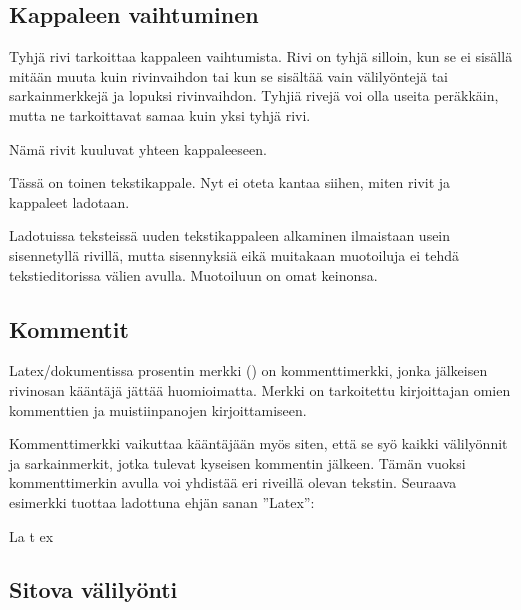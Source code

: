 \subsection{Kappaleen vaihtuminen}

Tyhjä rivi tarkoittaa kappaleen vaihtumista. Rivi on tyhjä silloin, kun
se ei sisällä mitään muuta kuin rivinvaihdon tai kun se sisältää vain
välilyöntejä tai sarkainmerkkejä ja lopuksi rivinvaihdon. Tyhjiä rivejä
voi olla useita peräkkäin, mutta ne tarkoittavat samaa kuin yksi tyhjä
rivi.

\begin{koodilohkosis}
  Nämä rivit kuuluvat
  yhteen kappaleeseen.

  Tässä on toinen tekstikappale.
  Nyt ei oteta kantaa siihen, miten
  rivit ja kappaleet ladotaan.
\end{koodilohkosis}

Ladotuissa teksteissä uuden tekstikappaleen alkaminen ilmaistaan usein
sisennetyllä rivillä, mutta sisennyksiä eikä muitakaan muotoiluja ei
tehdä tekstieditorissa välien avulla. Muotoiluun on omat keinonsa.

\subsection{Kommentit}

Latex\-/dokumentissa prosentin merkki (\koodi{\%}) on kommenttimerkki,
jonka jälkeisen rivin\-osan kääntäjä jättää huomioimatta. Merkki on
tarkoitettu kirjoittajan omien kommenttien ja muistiinpanojen
kirjoittamiseen.

\begin{koodilohkosis}
\end{koodilohkosis}

Kommenttimerkki vaikuttaa kääntäjään myös siten, että se syö kaikki
välilyönnit ja sarkainmerkit, jotka tulevat kyseisen kommentin jälkeen.
Tämän vuoksi kommenttimerkin avulla voi yhdistää eri riveillä olevan
tekstin. Seuraava esimerkki tuottaa ladottuna ehjän sanan ''Latex'':

\begin{koodilohkosis}
  La%
    t%
      ex
\end{koodilohkosis}

\subsection{Sitova välilyönti}

